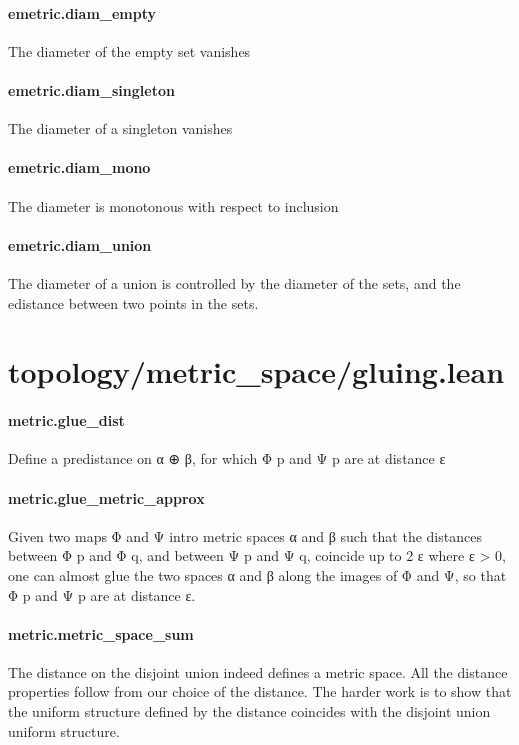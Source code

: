 \documentclass{article}
\begin{document}
\paragraph{emetric.diam\_empty}
\par
The diameter of the empty set vanishes
\paragraph{emetric.diam\_singleton}
\par
The diameter of a singleton vanishes
\paragraph{emetric.diam\_mono}
\par
The diameter is monotonous with respect to inclusion
\paragraph{emetric.diam\_union}
\par
The diameter of a union is controlled by the diameter of the sets, and the edistance
between two points in the sets.
\section{topology/metric\_space/gluing.lean}\paragraph{metric.glue\_dist}
\par
Define a predistance on α ⊕ β, for which Φ p and Ψ p are at distance ε
\paragraph{metric.glue\_metric\_approx}
\par
Given two maps Φ and Ψ intro metric spaces α and β such that the distances between Φ p and Φ q,
and between Ψ p and Ψ q, coincide up to 2 ε where ε > 0, one can almost glue the two spaces α
and β along the images of Φ and Ψ, so that Φ p and Ψ p are at distance ε.
\paragraph{metric.metric\_space\_sum}
\par
The distance on the disjoint union indeed defines a metric space. All the distance properties follow from our
choice of the distance. The harder work is to show that the uniform structure defined by the distance coincides
with the disjoint union uniform structure.
\end{document}
